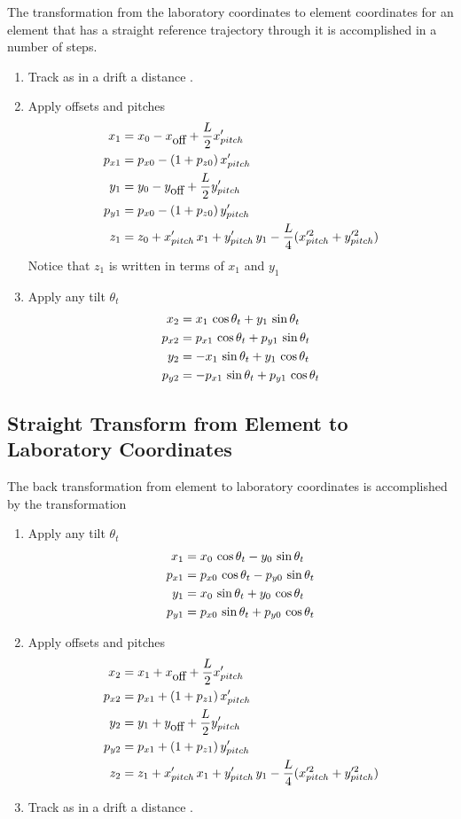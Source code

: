 The transformation from the laboratory coordinates to
element coordinates for an element that has a
straight reference trajectory through it is accomplished in a number of steps.
\begin{enumerate}
\item
Track as in a drift a distance .
\item
Apply offsets and pitches
\begin{align}
  x_1    &= x_0 - x_{\mbox{off}} + \frac{L}{2} x'_{pitch} \nonumber \\
  p_{x1} &= p_{x0} - (1 + p_{z0}) \, x'_{pitch} \nonumber \\
  y_1    &= y_0 - y_{\mbox{off}} + \frac{L}{2} y'_{pitch} \\
  p_{y1} &= p_{x0} - (1 + p_{z0}) \, y'_{pitch} \nonumber \\
  z_1    &= z_0 + x'_{pitch} \, x_1 + y'_{pitch} \, y_1 - 
    \frac{L}{4} (x^{\prime2}_{pitch} + y^{\prime2}_{pitch}) \nonumber
\end{align}
Notice that $z_1$ is written in terms of $x_1$ and $y_1$
\item
Apply any tilt $\theta_t$
\begin{align}
  x_2    &=  x_1    \, \cos\theta_t + y_1    \, \sin\theta_t \nonumber \\
  p_{x2} &=  p_{x1} \, \cos\theta_t + p_{y1} \, \sin\theta_t \nonumber \\
  y_2    &= -x_1    \, \sin\theta_t + y_1    \, \cos\theta_t \\
  p_{y2} &= -p_{x1} \, \sin\theta_t + p_{y1} \, \cos\theta_t \nonumber
\end{align}
\end{enumerate}

\subsection{Straight Transform from Element to Laboratory Coordinates}

The back transformation from element to laboratory coordinates is
accomplished by the transformation
\begin{enumerate}
\item
Apply any tilt $\theta_t$
\begin{align}
  x_1    &=  x_0    \, \cos\theta_t - y_0    \, \sin\theta_t \nonumber \\
  p_{x1} &=  p_{x0} \, \cos\theta_t - p_{y0} \, \sin\theta_t \nonumber \\
  y_1    &=  x_0    \, \sin\theta_t + y_0    \, \cos\theta_t \\
  p_{y1} &=  p_{x0} \, \sin\theta_t + p_{y0} \, \cos\theta_t \nonumber
\end{align}
\item
Apply offsets and pitches
\begin{align}
  x_2    &= x_1 + x_{\mbox{off}} + \frac{L}{2} x'_{pitch}     \nonumber \\
  p_{x2} &= p_{x1} + (1 + p_{z1}) \, x'_{pitch}        \nonumber \\
  y_2    &= y_1 + y_{\mbox{off}} + \frac{L}{2} y'_{pitch}     \\
  p_{y2} &= p_{x1} + (1 + p_{z1}) \, y'_{pitch}        \nonumber \\
  z_2    &= z_1 + x'_{pitch} \, x_1 + y'_{pitch} \, y_1 - 
    \frac{L}{4} (x^{\prime2}_{pitch} + y^{\prime2}_{pitch})      \nonumber
\end{align}
\item
Track as in a drift a distance .
\end{enumerate}


